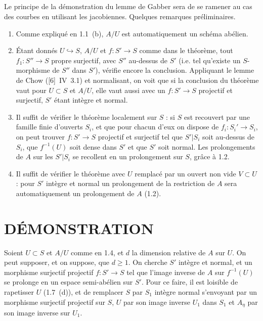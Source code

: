 \documentclass[12pt,a4paper]{article}
\theoremstyle{plain}
\theoremstyle{definition}
\theoremstyle{remark}
\begin{document}
\subsection{} Le principe de la démonstration du lemme de Gabber sera de se ramener au cas des courbes en utilisant les jacobiennes. Quelques remarques préliminaires.

\begin{enumerate}[label=(\alph*)]
\item Comme expliqué en 1.1~(b), $A/U$ est automatiquement un schéma abélien.
\item Étant donnés $U \hookrightarrow S$, $A/U$ et $f : S' \to S$ comme dans le théorème, tout $f_1 : S'' \to S$ propre surjectif, avec $S''$ au-dessus de $S'$ (i.e. tel qu'existe un $S$-morphisme de $S''$ dans $S'$), vérifie encore la conclusion. Appliquant le lemme de Chow ([6]~IV~3.1) et normalisant, on voit que si la conclusion du théorème vaut pour $U \subset S$ et $A/U$, elle vaut aussi avec un $f : S' \to S$ projectif et surjectif, $S'$ étant intègre et normal.
\item Il suffit de vérifier le théorème localement sur $S$ : si $S$ est recouvert par une famille finie d'ouverts $S_i$, et que pour chacun d'eux on dispose de $f_i : S_i' \to S_i$, on peut trouver $f : S' \to S$ projectif et surjectif tel que $S'|S_i$ soit au-dessus de $S_i$, que $f^{-1}(U)$ soit dense dans $S'$ et que $S'$ soit normal. Les prolongements de $A$ sur les $S'|S_i$ se recollent en un prolongement sur $S$, grâce à 1.2.
\item Il suffit de vérifier le théorème avec $U$ remplacé par un ouvert non vide $V \subset U$ : pour $S'$ intègre et normal un prolongement de la restriction de $A$ sera automatiquement un prolongement de $A$ (1.2).
\end{enumerate}


\section{DÉMONSTRATION}

Soient $U \subset S$ et $A/U$ comme en 1.4, et $d$ la dimension relative de $A$ sur $U$. On peut supposer, et on suppose, que $d \geq 1$. On cherche $S'$ intègre et normal, et un morphisme surjectif projectif $f : S' \to S$ tel que l'image inverse de $A$ sur $f^{-1}(U)$ se prolonge en un espace semi-abélien sur $S'$. Pour ce faire, il est loisible de rapetisser $U$ (1.7~(d)), et de remplacer $S$ par $S_1$ intègre normal s'envoyant par un morphisme surjectif projectif sur $S$, $U$ par son image inverse $U_1$ dans $S_1$ et $A_\eta$ par son image inverse sur $U_1$.
\end{document}
